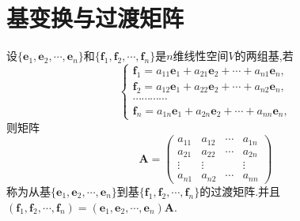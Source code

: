 \documentclass[../../main.tex]{subfiles}%
\begin{document}
\section{基变换与过渡矩阵}

\begin{definition}[过渡矩阵]\label{definition:过渡矩阵}
设\(\{\boldsymbol{e}_1,\boldsymbol{e}_2,\cdots,\boldsymbol{e}_n\}\)和\(\{\boldsymbol{f}_1,\boldsymbol{f}_2,\cdots,\boldsymbol{f}_n\}\)是\(n\)维线性空间\(V\)的两组基,若
\[
\begin{cases}
\boldsymbol{f}_1 = a_{11}\boldsymbol{e}_1 + a_{21}\boldsymbol{e}_2+\cdots + a_{n1}\boldsymbol{e}_n,\\
\boldsymbol{f}_2 = a_{12}\boldsymbol{e}_1 + a_{22}\boldsymbol{e}_2+\cdots + a_{n2}\boldsymbol{e}_n,\\
\cdots\cdots\cdots\cdots\\
\boldsymbol{f}_n = a_{1n}\boldsymbol{e}_1 + a_{2n}\boldsymbol{e}_2+\cdots + a_{nn}\boldsymbol{e}_n,
\end{cases}
\]
则矩阵
\[
\boldsymbol{A}=\begin{pmatrix}
a_{11}&a_{12}&\cdots&a_{1n}\\
a_{21}&a_{22}&\cdots&a_{2n}\\
\vdots&\vdots&&\vdots\\
a_{n1}&a_{n2}&\cdots&a_{nn}
\end{pmatrix}
\]
称为从基\(\{\boldsymbol{e}_1,\boldsymbol{e}_2,\cdots,\boldsymbol{e}_n\}\)到基\(\{\boldsymbol{f}_1,\boldsymbol{f}_2,\cdots,\boldsymbol{f}_n\}\)的过渡矩阵.并且$\left( \boldsymbol{f}_1,\boldsymbol{f}_2,\cdots ,\boldsymbol{f}_n \right) =\left( \boldsymbol{e}_1,\boldsymbol{e}_2,\cdots ,\boldsymbol{e}_n \right) \boldsymbol{A}$.
\end{definition}
\end{document}
